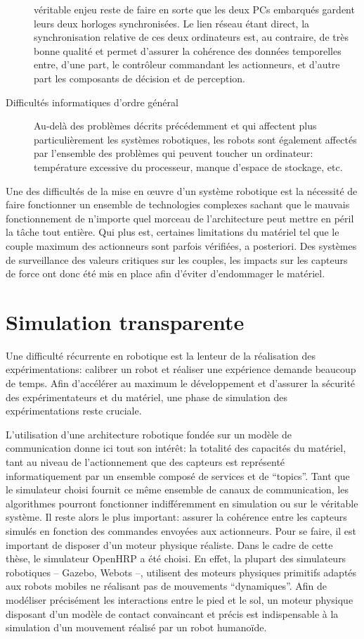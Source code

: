 \begin{description}
  véritable enjeu reste de faire en sorte que les deux PCs embarqués
  gardent leurs deux horloges synchronisées. Le lien réseau étant
  direct, la synchronisation relative de ces deux ordinateurs est, au
  contraire, de très bonne qualité et permet d'assurer la cohérence
  des données temporelles entre, d'une part, le contrôleur commandant
  les actionneurs, et d'autre part les composants de décision et de
  perception.
\item[Difficultés informatiques d'ordre général] Au-delà des problèmes
  décrits précédemment et qui affectent plus particulièrement les
  systèmes robotiques, les robots sont également affectés par
  l'ensemble des problèmes qui peuvent toucher un ordinateur:
  température excessive du processeur, manque d'espace de stockage,
  etc.
\end{description}

Une des difficultés de la mise en \oe uvre d'un système robotique est
la nécessité de faire fonctionner un ensemble de technologies
complexes sachant que le mauvais fonctionnement de n'importe quel
morceau de l'architecture peut mettre en péril la tâche tout
entière. Qui plus est, certaines limitations du matériel tel que le
couple maximum des actionneurs sont parfois vérifiées, a
posteriori. Des systèmes de surveillance des valeurs critiques sur les
couples, les impacts sur les capteurs de force ont donc été mis en
place afin d'éviter d'endommager le matériel.


\section{Simulation transparente}


Une difficulté récurrente en robotique est la lenteur de la
réalisation des expérimentations: calibrer un robot et réaliser une
expérience demande beaucoup de temps. Afin d'accélérer au maximum le
développement et d'assurer la sécurité des expérimentateurs et du
matériel, une phase de simulation des expérimentations reste cruciale.


L'utilisation d'une architecture robotique fondée sur un modèle de
communication donne ici tout son intérêt: la totalité des capacités du
matériel, tant au niveau de l'actionnement que des capteurs est
représenté informatiquement par un ensemble composé de services et de
``topics''. Tant que le simulateur choisi fournit ce même ensemble de
canaux de communication, les algorithmes pourront fonctionner
indifféremment en simulation ou sur le véritable système. Il reste
alors le plus important: assurer la cohérence entre les capteurs
simulés en fonction des commandes envoyées aux actionneurs. Pour se
faire, il est important de disposer d'un moteur physique
réaliste. Dans le cadre de cette thèse, le simulateur OpenHRP a été
choisi. En effet, la plupart des simulateurs robotiques -- Gazebo,
Webots --, utilisent des moteurs physiques primitifs adaptés aux
robots mobiles ne réalisant pas de mouvements ``dynamiques''. Afin de
modéliser précisément les interactions entre le pied et le sol, un
moteur physique disposant d'un modèle de contact convaincant et précis
est indispensable à la simulation d'un mouvement réalisé par un robot
humanoïde.


